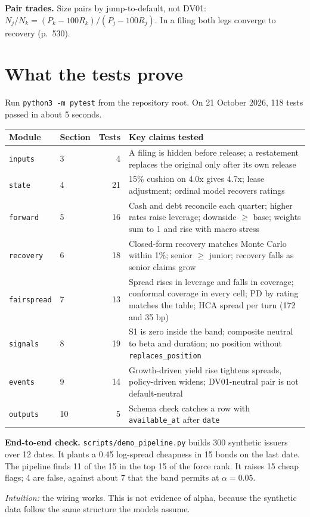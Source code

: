 \documentclass[11pt,a4paper]{article}
\newcommand{\code}[1]{\texttt{\small #1}}
\newcommand{\why}[1]{\par\noindent\textcolor{teal!60!black}{\textit{Intuition:} #1}\par}
\begin{document}
\textbf{Pair trades.} Size pairs by jump-to-default, not DV01: $N_j/N_k=(P_k-100R_k)/(P_j-100R_j)$. In a filing both legs converge to recovery (p.~530).

\section{What the tests prove}
\label{sec:tests}
Run \code{python3 -m pytest} from the repository root. On 21 October 2026, 118 tests passed in about 5 seconds.

\medskip
{\small\begin{tabularx}{\linewidth}{@{}llrX@{}}\toprule
Module & Section & Tests & Key claims tested \\\midrule
\code{inputs} & 3 & 4 & A filing is hidden before release; a restatement replaces the original only after its own release \\
\code{state} & 4 & 21 & 15\% cushion on 4.0x gives 4.7x; lease adjustment; ordinal model recovers ratings \\
\code{forward} & 5 & 16 & Cash and debt reconcile each quarter; higher rates raise leverage; downside $\ge$ base; weights sum to 1 and rise with macro stress \\
\code{recovery} & 6 & 18 & Closed-form recovery matches Monte Carlo within 1\%; senior $\ge$ junior; recovery falls as senior claims grow \\
\code{fairspread} & 7 & 13 & Spread rises in leverage and falls in coverage; conformal coverage in every cell; PD by rating matches the table; HCA spread per turn (172 and 35 bp) \\
\code{signals} & 8 & 19 & S1 is zero inside the band; composite neutral to beta and duration; no position without \code{replaces\_position} \\
\code{events} & 9 & 14 & Growth-driven yield rise tightens spreads, policy-driven widens; DV01-neutral pair is not default-neutral \\
\code{outputs} & 10 & 5 & Schema check catches a row with \code{available\_at} after \code{date} \\\bottomrule
\end{tabularx}}

\medskip
\textbf{End-to-end check.} \code{scripts/demo\_pipeline.py} builds 300 synthetic issuers over 12 dates. It plants a 0.45 log-spread cheapness in 15 bonds on the last date. The pipeline finds 11 of the 15 in the top 15 of the force rank. It raises 15 cheap flags; 4 are false, against about 7 that the band permits at $\alpha=0.05$.
\why{the wiring works. This is not evidence of alpha, because the synthetic data follow the same structure the models assume.}
\end{document}
